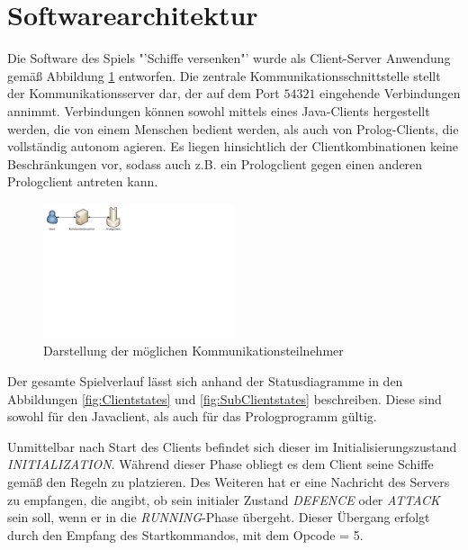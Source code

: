 \section{Softwarearchitektur} \label{sec:Softwarearchitektur}


Die Software des Spiels "'Schiffe versenken"' wurde als Client-Server Anwendung gemäß Abbildung \ref{fig:Kommunikationsteilnehmer} entworfen.
Die zentrale Kommunikationsschnittstelle stellt der Kommunikationsserver dar, der auf dem Port $54321$ eingehende Verbindungen annimmt.
Verbindungen können sowohl mittels eines Java-Clients hergestellt werden, die von einem Menschen bedient werden, als auch von Prolog-Clients, die vollständig autonom agieren.
Es liegen hinsichtlich der Clientkombinationen keine Beschränkungen vor, sodass auch z.B. ein Prologclient gegen einen anderen Prologclient antreten kann.

\begin{figure}[H]
  \centering
  \includegraphics[trim=0mm 165mm 175mm 0mm,clip,width=0.5\textwidth]{images/Kommunikationsmodell.pdf}
  \caption{Darstellung der möglichen Kommunikationsteilnehmer}
  \label{fig:Kommunikationsteilnehmer}
\end{figure}

Der gesamte Spielverlauf lässt sich anhand der Statusdiagramme in den Abbildungen \ref{fig:Clientstates} und \ref{fig:SubClientstates} beschreiben.
Diese sind sowohl für den Javaclient, als auch für das Prologprogramm gültig.

Unmittelbar nach Start des Clients befindet sich dieser im Initialisierungszustand \emph{INITIALIZATION}.
Während dieser Phase obliegt es dem Client seine Schiffe gemäß den Regeln zu platzieren.
Des Weiteren hat er eine Nachricht des Servers zu empfangen, die angibt, ob sein initialer Zustand \emph{DEFENCE} oder \emph{ATTACK} sein soll, wenn er in die \emph{RUNNING}-Phase übergeht.
Dieser Übergang erfolgt durch den Empfang des Startkommandos, mit dem Opcode = 5.

